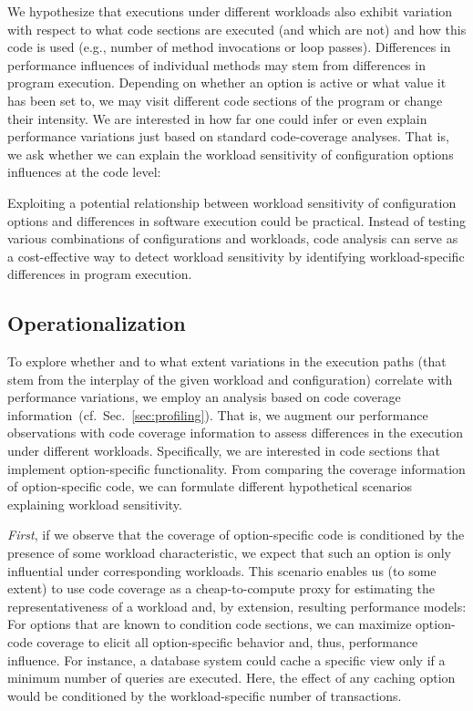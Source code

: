 {{{We hypothesize that executions under different workloads also exhibit variation with respect to what code sections are executed (and which are not) and how this code is used (e.g., number of method invocations or loop passes). Differences in performance influences of individual methods may stem from differences in program execution. Depending on whether an option is active or what value it has been set to, we may visit different code sections of the program or change their intensity. We are interested in how far one could infer or even explain performance variations just based on standard code-coverage analyses. That is, we ask whether we can explain the workload sensitivity of configuration options influences at the code level:


Exploiting a potential relationship between workload sensitivity of configuration options and differences in software execution could be practical. Instead of testing various combinations of configurations and workloads, code analysis can serve as a cost-effective way to detect workload sensitivity by identifying workload-specific differences in program execution.

\subsection{Operationalization}To explore whether and to what extent variations in the execution paths (that stem from the interplay of the given workload and configuration) correlate with performance variations, we employ an analysis based on code coverage information~(cf.~Sec.~\ref{sec:profiling}). That is, we augment our performance observations with code coverage information to assess differences in the execution under different workloads. Specifically, we are interested in code sections that implement option-specific functionality. From comparing the coverage information of option-specific code, we can formulate different hypothetical scenarios explaining workload sensitivity. 

\textit{First}, if we observe that the  coverage of option-specific code is conditioned by the presence of some workload characteristic, we expect that such an option is only influential under corresponding workloads. This scenario enables us (to some extent) to use code coverage as a cheap-to-compute proxy for estimating the representativeness of a workload and, by extension, resulting performance models: For options that are known to condition code sections, we can maximize option-code coverage to elicit all option-specific behavior and, thus, performance influence. For instance, a database system could cache a specific view only if a minimum number of queries are executed. Here, the effect of any caching option would be conditioned by the workload-specific number of transactions.

}}}
